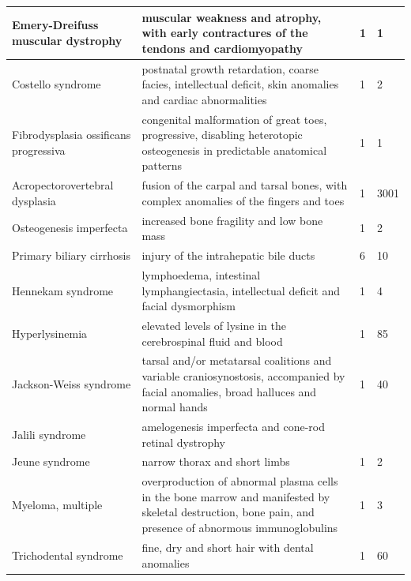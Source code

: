 \documentclass[10pt,letterpaper,final]{article}
\begin{document}
\begin{center}
\begin{small}
\begin{tabular}{|p{3.5cm}|p{6cm}|p{1.8cm}|p{1.8cm}|}
    \hline
    Emery-Dreifuss muscular dystrophy & muscular weakness and atrophy, with early contractures of the tendons and cardiomyopathy & 1 & 1\\
    \hline
    Costello syndrome & postnatal growth retardation, coarse facies, intellectual deficit, skin anomalies and cardiac abnormalities & 1 & 2\\
    \hline
    Fibrodysplasia ossificans progressiva & congenital malformation of great toes, progressive, disabling heterotopic osteogenesis in predictable anatomical patterns & 1 & 1\\
    \hline
    Acropectorovertebral dysplasia & fusion of the carpal and tarsal bones, with complex anomalies of the fingers and toes & 1 & 3001\\
    \hline
    Osteogenesis imperfecta & increased bone fragility and low bone mass & 1 & 2\\
    \hline
    Primary biliary cirrhosis & injury of the intrahepatic bile ducts & 6 & 10\\
    \hline
    Hennekam syndrome & lymphoedema, intestinal lymphangiectasia, intellectual deficit and facial dysmorphism & 1 & 4\\
    \hline
    Hyperlysinemia & elevated levels of lysine in the cerebrospinal fluid and blood & 1 & 85\\
    \hline
    Jackson-Weiss syndrome & tarsal and/or metatarsal coalitions and variable craniosynostosis, accompanied by facial anomalies, broad halluces and normal hands & 1 & 40\\
    \hline
    Jalili syndrome & amelogenesis imperfecta and cone-rod retinal dystrophy \\
    \hline
    Jeune syndrome & narrow thorax and short limbs & 1 & 2\\
    \hline
    Myeloma, multiple & overproduction of abnormal plasma cells in the bone marrow and manifested by skeletal destruction, bone pain, and presence of abnormous immunoglobulins & 1 & 3\\
    \hline
    Trichodental syndrome & fine, dry and short hair with dental anomalies & 1 & 60\\
    \hline
    \end{tabular}
\end{small}
\end{center}
\end{document}
